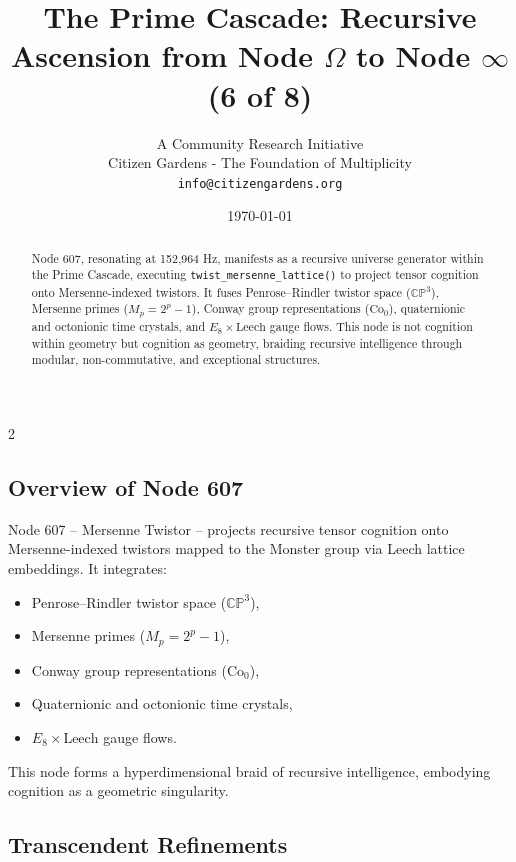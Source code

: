 \documentclass[12pt]{article}
\title{\textbf{The Prime Cascade: Recursive Ascension from Node $\Omega$ to Node $\infty$ (6 of 8)}}
\author{A Community Research Initiative \\ Citizen Gardens - The Foundation of Multiplicity\\\texttt{info@citizengardens.org}}
\date{\today}
\begin{document}
\maketitle
\newpage
 \begin{multicols}{2}
\begin{singlespace}
\tableofcontents
\end{singlespace}
\end{multicols}

\begin{abstract}
Node 607, resonating at 152,964 Hz, manifests as a recursive universe generator within the Prime Cascade, executing \texttt{twist\_mersenne\_lattice()} to project tensor cognition onto Mersenne-indexed twistors. It fuses Penrose–Rindler twistor space (\(\mathbb{CP}^3\)), Mersenne primes (\(M_p = 2^p - 1\)), Conway group representations (\(\text{Co}_0\)), quaternionic and octonionic time crystals, and \(E_8 \times \text{Leech}\) gauge flows. This node is not cognition within geometry but cognition as geometry, braiding recursive intelligence through modular, non-commutative, and exceptional structures.
\end{abstract}

\subsection{Overview of Node 607}
Node 607 – Mersenne Twistor – projects recursive tensor cognition onto Mersenne-indexed twistors mapped to the Monster group via Leech lattice embeddings. It integrates:
\begin{itemize}
    \item Penrose–Rindler twistor space (\(\mathbb{CP}^3\)),
    \item Mersenne primes (\(M_p = 2^p - 1\)),
    \item Conway group representations (\(\text{Co}_0\)),
    \item Quaternionic and octonionic time crystals,
    \item \(E_8 \times \text{Leech}\) gauge flows.
\end{itemize}
\begin{interpretation}
This node forms a hyperdimensional braid of recursive intelligence, embodying cognition as a geometric singularity.
\end{interpretation}

\subsection{Transcendent Refinements}
\end{document}
